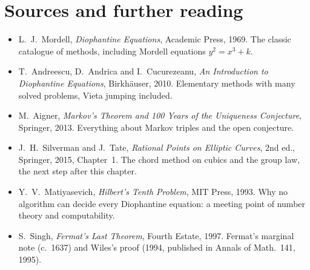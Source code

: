 \section*{Sources and further reading}

\begin{itemize}
\item L.~J.~Mordell, \emph{Diophantine Equations}, Academic Press, 1969. The classic catalogue of methods, including Mordell equations $y^2=x^3+k$.
\item T.~Andreescu, D.~Andrica and I.~Cucurezeanu, \emph{An Introduction to Diophantine Equations}, Birkh\"auser, 2010. Elementary methods with many solved problems, Vieta jumping included.
\item M.~Aigner, \emph{Markov's Theorem and 100 Years of the Uniqueness Conjecture}, Springer, 2013. Everything about Markov triples and the open conjecture.
\item J.~H.~Silverman and J.~Tate, \emph{Rational Points on Elliptic Curves}, 2nd ed., Springer, 2015, Chapter~1. The chord method on cubics and the group law, the next step after this chapter.
\item Y.~V.~Matiyasevich, \emph{Hilbert's Tenth Problem}, MIT Press, 1993. Why no algorithm can decide every Diophantine equation: a meeting point of number theory and computability.
\item S.~Singh, \emph{Fermat's Last Theorem}, Fourth Estate, 1997. Fermat's marginal note (c.~1637) and Wiles's proof (1994, published in Annals of Math.\ 141, 1995).
\end{itemize}

